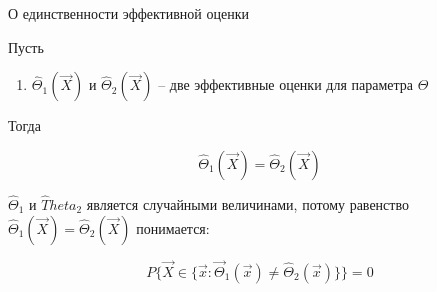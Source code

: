 \begin{theorem}
    О единственности эффективной оценки

    Пусть

    \begin{enumerate}
        \item $\hat \Theta_1 (\vec X)$ и $\hat \Theta_2 (\vec X)$ --
            две эффективные оценки для параметра $\Theta$
    \end{enumerate}

    Тогда

    \begin{equation*}
        \hat \Theta_1 (\vec X) = \hat \Theta_2 (\vec X)
    \end{equation*}
\end{theorem}

\begin{note}
    $\hat \Theta_1$ и $\hat Theta_2$ является случайными величинами, потому
    равенство $\hat \Theta_1 (\vec X) = \hat \Theta_2 (\vec X)$ понимается:

    \begin{equation*}
        P \{ \vec X \in \{ \vec x : \vec \Theta_1 (\vec x) \ne
        \hat \Theta_2 (\vec x) \}\} = 0
    \end{equation*}
\end{note}
